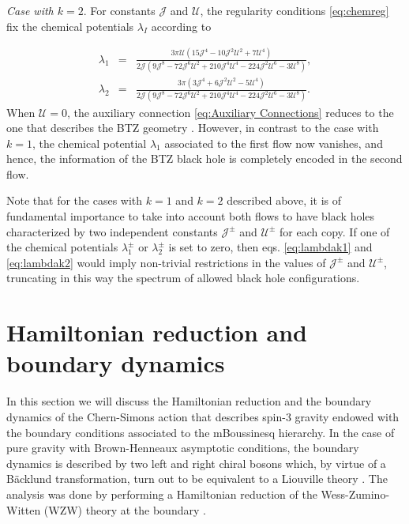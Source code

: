 \documentclass[letterpaper,11pt,oneside]{book}
\begin{document}
\emph{Case with $k=2$}. For constants $\mathcal{J}$ and $\mathcal{U}$,
the regularity conditions \eqref{eq:chemreg} fix the chemical potentials
$\lambda_{I}$ according to

\begin{eqnarray}
	\lambda_{1} & = & \frac{3\pi\mathcal{U}\left(15\mathcal{J}^{4}-10\mathcal{J}^{2}\mathcal{U}^{2}+7\mathcal{U}^{4}\right)}{2\mathcal{J}\left(9\mathcal{J}^{8}-72\mathcal{J}^{6}\mathcal{U}^{2}+210\mathcal{J}^{4}\mathcal{U}^{4}-224\mathcal{J}^{2}\mathcal{U}^{6}-3\mathcal{U}^{8}\right)},\nonumber \\
	\lambda_{2} & = & \frac{3\pi\left(3\mathcal{J}^{4}+6\mathcal{J}^{2}\mathcal{U}^{2}-5\mathcal{U}^{4}\right)}{2\mathcal{J}\left(9\mathcal{J}^{8}-72\mathcal{J}^{6}\mathcal{U}^{2}+210\mathcal{J}^{4}\mathcal{U}^{4}-224\mathcal{J}^{2}\mathcal{U}^{6}-3\mathcal{U}^{8}\right)}.\label{eq:lambdak2}
\end{eqnarray}
When $\mathcal{U}=0$, the auxiliary connection \eqref{eq:Auxiliary Connections}
reduces to the one that describes the BTZ geometry \cite{Afshar:2016wfy}.
However, in contrast to the case with $k=1$, the chemical potential
$\lambda_{1}$ associated to the first flow now vanishes, and hence,
the information of the BTZ black hole is completely encoded in the
second flow.

Note that for the cases with $k=1$ and $k=2$ described above, it
is of fundamental importance to take into account both flows to have
black holes characterized by two independent constants $\mathcal{J}^{\pm}$
and $\mathcal{U}^{\pm}$ for each copy. If one of the chemical potentials
$\lambda_{1}^{\pm}$ or $\lambda_{2}^{\pm}$ is set to zero, then
eqs. \eqref{eq:lambdak1} and \eqref{eq:lambdak2} would imply non-trivial
restrictions in the values of $\mathcal{J}^{\pm}$ and $\mathcal{U}^{\pm}$,
truncating in this way the spectrum of allowed black hole configurations.

\section{Hamiltonian reduction and boundary dynamics\label{sec:3 Reduction-of-the-Chern-Simons}}

In this section we will discuss the Hamiltonian reduction and the
boundary dynamics of the Chern-Simons action that describes spin-3
gravity endowed with the boundary conditions associated to the mBoussinesq
hierarchy. In the case of pure gravity with Brown-Henneaux asymptotic
conditions, the boundary dynamics is described by two left and right
chiral bosons which, by virtue of a Bäcklund transformation, turn
out to be equivalent to a Liouville theory \cite{Coussaert:1995zp,Henneaux:1999ib}.
The analysis was done by performing a Hamiltonian reduction of the
Wess-Zumino-Witten (WZW) theory at the boundary \cite{Forgacs:1989ac,Alekseev:1988ce,Witten:1989hf,Elitzur:1989nr}.
\end{document}
